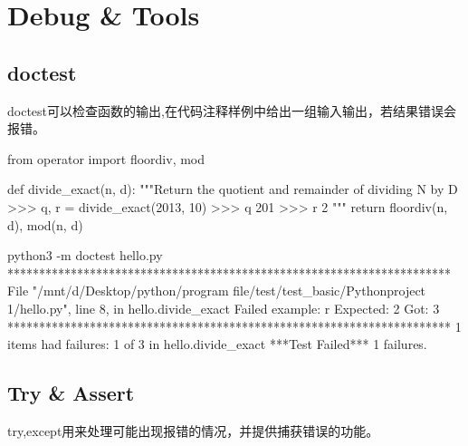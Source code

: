 \section{Debug \& Tools}

\subsection{doctest}
doctest可以检查函数的输出,在代码注释样例中给出一组输入输出，若结果错误会报错。
\begin{codeblock}[language=python, caption={doctest hello.py}]
  from operator import floordiv, mod
  
  def divide_exact(n, d):
  """Return the quotient and remainder of  dividing N by D
  >>> q, r = divide_exact(2013, 10)
  >>> q
  201
  >>> r
  2
  """
  return floordiv(n, d), mod(n, d)
\end{codeblock}

\begin{codeblock}[language=bash, caption={doctest bash}]
  python3 -m doctest hello.py
  **********************************************************************
  File "/mnt/d/Desktop/python/program file/test/test_basic/Pythonproject
  1/hello.py", line 8, in hello.divide_exact
  Failed example:
  r
  Expected:
  2
  Got:
  3
  **********************************************************************
  1 items had failures:
  1 of   3 in hello.divide_exact
  ***Test Failed*** 1 failures.
\end{codeblock}

\subsection{Try \& Assert}
try,except用来处理可能出现报错的情况，并提供捕获错误的功能。

